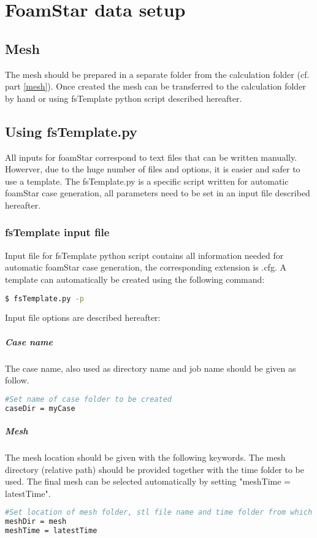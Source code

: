 \chapter{FoamStar data setup}

\section{Mesh}

The mesh should be prepared in a separate folder from the calculation folder (cf. part \ref{mesh}). Once created the mesh can be transferred to the calculation folder by hand or using fsTemplate python script described hereafter.

\section{Using fsTemplate.py}

All inputs for foamStar correspond to text files that can be written manually. Howerver, due to the huge number of files and options, it is easier and safer to use a template. The fsTemplate.py is a specific script written for automatic foamStar case generation, all parameters need to be set in an input file described hereafter.

\subsection{fsTemplate input file}

Input file for fsTemplate python script contains all information needed for automatic foamStar case generation, the corresponding extension is .cfg. A template can automatically be created using the following command:
\begin{lstlisting}[language=bash]
$ fsTemplate.py -p
\end{lstlisting}

Input file options are described hereafter:

\paragraph{Case name}
The case name, also used as directory name and job name should be given as follow.
\begin{lstlisting}[language=bash]
#Set name of case folder to be created
caseDir = myCase
\end{lstlisting}

\paragraph{Mesh}
The mesh location should be given with the following keywords. The mesh directory (relative path) should be provided together with the time folder to be used. The final mesh can be selected automatically by setting "meshTime = latestTime".
\begin{lstlisting}[language=bash]
#Set location of mesh folder, stl file name and time folder from which it should be retrieved ('0.08', '0.09' or 'latestTime')
meshDir = mesh
meshTime = latestTime
\end{lstlisting}


